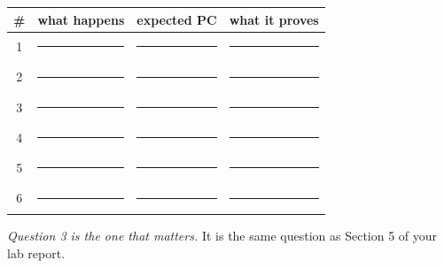 \documentclass[11pt]{article}
\begin{document}
\begin{center}
\begin{tabular}{@{}c@{\hskip 8pt}p{5.4cm}@{\hskip 8pt}p{3cm}@{\hskip 8pt}p{3.4cm}@{}}
\toprule
\# & what happens & expected PC & what it proves \\
\midrule
1 & \rule{5.2cm}{0.4pt} & \rule{2.8cm}{0.4pt} & \rule{3.2cm}{0.4pt} \\[7pt]
2 & \rule{5.2cm}{0.4pt} & \rule{2.8cm}{0.4pt} & \rule{3.2cm}{0.4pt} \\[7pt]
3 & \rule{5.2cm}{0.4pt} & \rule{2.8cm}{0.4pt} & \rule{3.2cm}{0.4pt} \\[7pt]
4 & \rule{5.2cm}{0.4pt} & \rule{2.8cm}{0.4pt} & \rule{3.2cm}{0.4pt} \\[7pt]
5 & \rule{5.2cm}{0.4pt} & \rule{2.8cm}{0.4pt} & \rule{3.2cm}{0.4pt} \\[7pt]
6 & \rule{5.2cm}{0.4pt} & \rule{2.8cm}{0.4pt} & \rule{3.2cm}{0.4pt} \\
\bottomrule
\end{tabular}
\end{center}

\vfill
{\small\emph{Question 3 is the one that matters.} It is the same question as
Section 5 of your lab report.}
\end{document}
